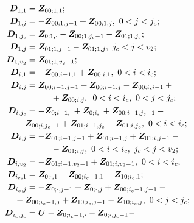 \begin{multicols}{2}
\noindent
  \begin{align*}
  \boldsymbol{D}_{1,1} &= \boldsymbol{Z}_{00;1,1}; \\
  \boldsymbol{D}_{1,j} &= -\boldsymbol{Z}_{00;1,j-1} + \boldsymbol{Z}_{00;1,j},\ 0 < j < j_c; \\
  \boldsymbol{D}_{1,j_c} &= \boldsymbol{Z}_{0;1,\cdot} - \boldsymbol{Z}_{00;1,j_c-1} - \boldsymbol{Z}_{01;1,j_c}; \\
  \boldsymbol{D}_{1,j} &= \boldsymbol{Z}_{01;1,j-1} - \boldsymbol{Z}_{01;1,j},\  j_c < j < v_2;\\ 
  \boldsymbol{D}_{1,v_2} &= \boldsymbol{Z}_{01;1,v_2-1}; \\
  \boldsymbol{D}_{i,1} &= -\boldsymbol{Z}_{00;i-1,1} + \boldsymbol{Z}_{00;i,1},\ 0 < i < i_c; \\
  \boldsymbol{D}_{i,j} &= \boldsymbol{Z}_{00;i-1,j-1} - \boldsymbol{Z}_{00;i-1,j} - \boldsymbol{Z}_{00;i,j-1} +{}\\
  &\hspace*{10mm}{}+ \boldsymbol{Z}_{00;i,j},\enskip  0 < i < i_c,\ 0 < j < j_c;\\
  \boldsymbol{D}_{i,j_c} &= -\boldsymbol{Z}_{0;i-1,\cdot} + \boldsymbol{Z}_{0;i,\cdot} + \boldsymbol{Z}_{00;i-1,j_c-1} - {}\\
&\hspace*{-5mm}{}-\boldsymbol{Z}_{00;i,j_c-1} + \boldsymbol{Z}_{01;i-1,j_c} - \boldsymbol{Z}_{01;i,j_c},\ 0 < i < i_c; \\
  \boldsymbol{D}_{i,j} &= -\boldsymbol{Z}_{01;i-1,j-1} + \boldsymbol{Z}_{01;i-1,j} + \boldsymbol{Z}_{01;i,j-1} - {}\\
&\hspace*{10mm} {}-
\boldsymbol{Z}_{01;i,j},\ 0 < i < i_c,\  j_c < j < v_2; \\
  \boldsymbol{D}_{i,v_2} &= -\boldsymbol{Z}_{01;i-1,v_2-1} + \boldsymbol{Z}_{01;i,v_2-1},\ 0 < i < i_c; \\
  \boldsymbol{D}_{i_c,1} &= \boldsymbol{Z}_{0;\cdot,1} - \boldsymbol{Z}_{00;i_c-1,1} - \boldsymbol{Z}_{10;i_c,1}; \\
  \boldsymbol{D}_{i_c,j} &= -\boldsymbol{Z}_{0;\cdot,j-1} + \boldsymbol{Z}_{0;\cdot,j} + \boldsymbol{Z}_{00;i_c-1,j-1} - {}\\
&\hspace*{-5mm}  {}-
\boldsymbol{Z}_{00;i_c-1,j} + \boldsymbol{Z}_{10;i_c,j-1} - \boldsymbol{Z}_{10;i_c,j},\ 0 < j < j_c; \\
  \boldsymbol{D}_{i_c,j_c} &= \boldsymbol{U} - \boldsymbol{Z}_{0;i_c-1,\cdot} - \boldsymbol{Z}_{0;\cdot,j_c-1} - 

\end{align*}
\end{multicols}
